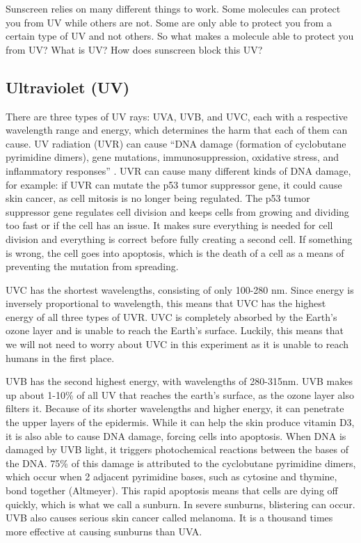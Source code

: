 \documentclass{article}
\begin{document}
  Sunscreen relies on many different things to work. Some molecules can protect you from UV while others are not. Some are only able to protect you from a certain type of UV and not others. So what makes a molecule able to protect you from UV? What is UV? How does sunscreen block this UV?


\subsection{Ultraviolet (UV)}
There are three types of UV rays: UVA, UVB, and UVC, each with a respective wavelength range and energy, which determines the harm that each of them can cause. UV radiation (UVR) can cause “DNA damage (formation of cyclobutane pyrimidine dimers), gene mutations, immunosuppression, oxidative stress, and inflammatory responses” \cite{fox_review_2010}.  UVR can cause many different kinds of DNA damage, for example: if UVR can mutate the p53 tumor suppressor gene, it could cause skin cancer, as cell mitosis is no longer being regulated. The p53 tumor suppressor gene regulates cell division and keeps cells from growing and dividing too fast or if the cell has an issue. It makes sure everything is needed for cell division and everything is correct before fully creating a second cell. If something is wrong, the cell goes into apoptosis, which is the death of a cell as a means of preventing the mutation from spreading.

UVC has the shortest wavelengths, consisting of only 100-280 nm. Since energy is inversely proportional to wavelength, this means that UVC has the highest energy of all three types of UVR. UVC is completely absorbed by the Earth’s ozone layer and is unable to reach the Earth’s surface. Luckily, this means that we will not need to worry about UVC in this experiment as it is unable to reach humans in the first place.

UVB has the second highest energy, with wavelengths of 280-315nm. UVB makes up about 1-10\% of all UV that reaches the earth’s surface, as the ozone layer also filters it. Because of its shorter wavelengths and higher energy, it can penetrate the upper layers of the epidermis. While it can help the skin produce vitamin D3, it is also able to cause DNA damage, forcing cells into apoptosis. When DNA is damaged by UVB light, it triggers photochemical reactions between the bases of the DNA. 75\% of this damage is attributed to the cyclobutane pyrimidine dimers, which occur when 2 adjacent pyrimidine bases, such as cytosine and thymine, bond together (Altmeyer). This rapid apoptosis means that cells are dying off quickly, which is what we call a sunburn. In severe sunburns, blistering can occur. UVB also causes serious skin cancer called melanoma. It is a thousand times more effective at causing sunburns than UVA. 
\end{document}
